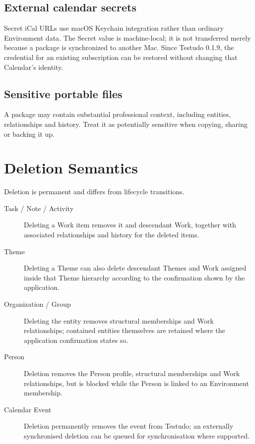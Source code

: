 \documentclass{testudomanual}
\begin{document}
\section{External calendar secrets}

Secret iCal URLs use macOS Keychain integration rather than ordinary Environment data. The Secret value is machine-local; it is not transferred merely because a  package is synchronized to another Mac. Since Testudo 0.1.9, the credential for an existing subscription can be restored without changing that Calendar's identity.

\section{Sensitive portable files}

A  package may contain substantial professional context, including entities, relationships and history. Treat it as potentially sensitive when copying, sharing or backing it up.

\chapter{Deletion Semantics}

Deletion is permanent and differs from lifecycle transitions.

\begin{description}
    \item[Task / Note / Activity] Deleting a Work item removes it and descendant Work, together with associated relationships and history for the deleted items.
    \item[Theme] Deleting a Theme can also delete descendant Themes and Work assigned inside that Theme hierarchy according to the confirmation shown by the application.
    \item[Organization / Group] Deleting the entity removes structural memberships and Work relationships; contained entities themselves are retained where the application confirmation states so.
    \item[Person] Deletion removes the Person profile, structural memberships and Work relationships, but is blocked while the Person is linked to an Environment membership.
    \item[Calendar Event] Deletion permanently removes the event from Testudo; an externally synchronised deletion can be queued for synchronisation where supported.
\end{description}
\end{document}

